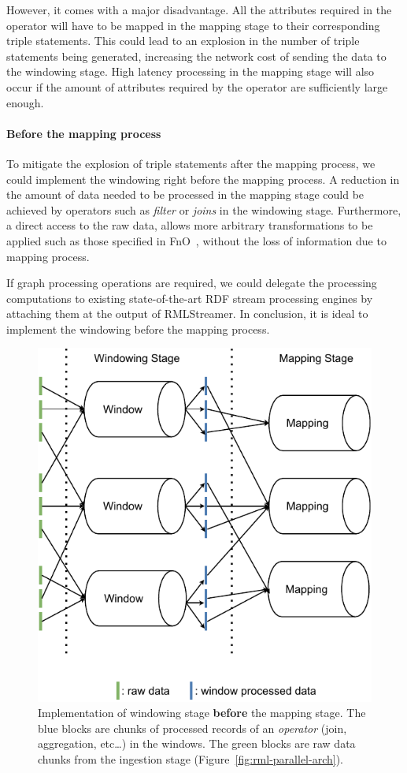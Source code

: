 However, it comes with a major disadvantage. All the attributes required in the operator 
will have to be mapped in the mapping stage to their corresponding triple statements. 
This could lead to an explosion in the number of triple statements being generated, increasing 
the network cost of sending the data to the windowing stage. High latency processing in 
the mapping stage will also occur if the amount of attributes required by 
the operator are sufficiently large enough. 


\paragraph{Before the mapping process}%
\label{par:Before the mapping process}
To mitigate the explosion of triple statements after the mapping process, we could implement 
the windowing right before the mapping process. A reduction in the amount of 
data needed to be processed in the mapping stage could be achieved by operators 
such as \emph{filter} or \emph{joins} in the windowing stage. Furthermore, a direct 
access to the raw data, allows more arbitrary transformations to be applied such as 
those specified in FnO~\cite{fno_ben}, without the loss of 
information due to mapping process. 

If graph processing operations are required, we could delegate the processing computations to 
existing state-of-the-art RDF stream processing engines by attaching them at the output of 
RMLStreamer. In conclusion, it is ideal to implement the windowing before the mapping process. 


\begin{figure}[htpb]
    \centering
    \includegraphics[width=0.7\linewidth]{fig/window_site.pdf}
    \caption{Implementation of windowing stage \textbf{before} the mapping stage. The blue blocks 
    are chunks of processed records of an \emph{operator} (join, aggregation, etc\dots) in the windows. 
    The green blocks are raw data chunks from the 
    ingestion stage (Figure~\ref{fig:rml-parallel-arch}). }%
    \label{fig:fig/s}
\end{figure}


